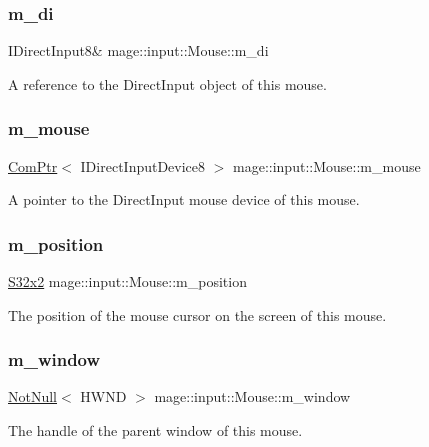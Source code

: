 \subsubsection{\texorpdfstring{m\+\_\+di}{m\_di}}
{\footnotesize\ttfamily I\+Direct\+Input8\& mage\+::input\+::\+Mouse\+::m\+\_\+di\hspace{0.3cm}{\ttfamily [private]}}

A reference to the Direct\+Input object of this mouse. \mbox{\label{classmage_1_1input_1_1_mouse_acce273ae24a5f7ba107f2f15618bbea6}} 
\subsubsection{\texorpdfstring{m\+\_\+mouse}{m\_mouse}}
{\footnotesize\ttfamily \mbox{\hyperlink{namespacemage_ae74f374780900893caa5555d1031fd79}{Com\+Ptr}}$<$ I\+Direct\+Input\+Device8 $>$ mage\+::input\+::\+Mouse\+::m\+\_\+mouse\hspace{0.3cm}{\ttfamily [private]}}

A pointer to the Direct\+Input mouse device of this mouse. \mbox{\label{classmage_1_1input_1_1_mouse_a240e60291f97e6b281d11cfd52d38e53}} 
\subsubsection{\texorpdfstring{m\+\_\+position}{m\_position}}
{\footnotesize\ttfamily \mbox{\hyperlink{namespacemage_aad06aca0b442d3b41653eafed822d571}{S32x2}} mage\+::input\+::\+Mouse\+::m\+\_\+position\hspace{0.3cm}{\ttfamily [private]}}

The position of the mouse cursor on the screen of this mouse. \mbox{\label{classmage_1_1input_1_1_mouse_a9fc088bd15bc89c9791642e4a95e81bc}} 
\subsubsection{\texorpdfstring{m\+\_\+window}{m\_window}}
{\footnotesize\ttfamily \mbox{\hyperlink{namespacemage_a8769f9d670d6b585ea306cb1062af94b}{Not\+Null}}$<$ H\+W\+ND $>$ mage\+::input\+::\+Mouse\+::m\+\_\+window\hspace{0.3cm}{\ttfamily [private]}}

The handle of the parent window of this mouse. 